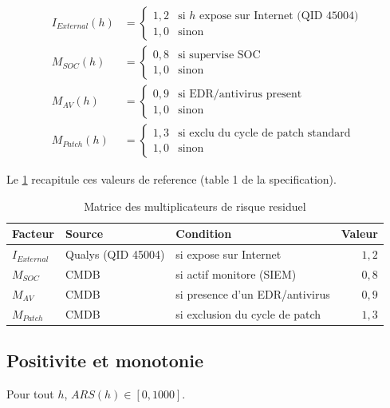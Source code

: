 \begin{align}
I_{External}(h) &= \begin{cases} 1{,}2 & \text{si $h$ expose sur Internet (QID 45004)} \\ 1{,}0 & \text{sinon} \end{cases} \\
M_{SOC}(h) &= \begin{cases} 0{,}8 & \text{si supervise SOC} \\ 1{,}0 & \text{sinon} \end{cases} \\
M_{AV}(h) &= \begin{cases} 0{,}9 & \text{si EDR/antivirus present} \\ 1{,}0 & \text{sinon} \end{cases} \\
M_{Patch}(h) &= \begin{cases} 1{,}3 & \text{si exclu du cycle de patch standard} \\ 1{,}0 & \text{sinon} \end{cases}
\end{align}

Le \cref{tab:multiplicateurs} recapitule ces valeurs de reference (table 1 de la
specification).

\begin{table}[H]
\centering
\caption{Matrice des multiplicateurs de risque residuel}
\label{tab:multiplicateurs}
\begin{tabular}{@{}lllr@{}}
\toprule
\textbf{Facteur} & \textbf{Source} & \textbf{Condition} & \textbf{Valeur} \\
\midrule
$I_{External}$ & Qualys (QID 45004) & si expose sur Internet & $1{,}2$ \\
$M_{SOC}$ & CMDB & si actif monitore (SIEM) & $0{,}8$ \\
$M_{AV}$ & CMDB & si presence d'un EDR/antivirus & $0{,}9$ \\
$M_{Patch}$ & CMDB & si exclusion du cycle de patch & $1{,}3$ \\
\bottomrule
\end{tabular}
\end{table}

\subsection{Positivite et monotonie}

\begin{propriete}[Positivite]
\label{prop:ars-pos}
Pour tout $h$, $ARS(h) \in [0,1000]$.
\end{propriete}

